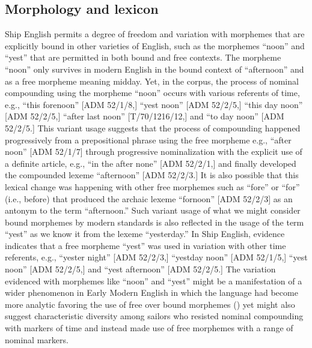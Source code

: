 \subsection{\textbf{Morphology} \textbf{and} \textbf{lexicon}}%

  Ship English permits a degree of freedom and variation with morphemes that are explicitly bound in other varieties of English, such as the morphemes “noon” and “yest” that are permitted in both bound and free contexts. The morpheme “noon” only survives in modern English in the bound context of “afternoon” and as a free morpheme meaning midday. Yet, in the corpus, the process of nominal compounding using the morpheme “noon” occurs with various referents of time, e.g., “this forenoon” [ADM 52/1/8,] “yest noon” [ADM 52/2/5,] “this day noon” [ADM 52/2/5,] “after last noon” [T/70/1216/12,] and “to day noon” [ADM 52/2/5.] This variant usage suggests that the process of compounding happened progressively from a prepositional phrase using the free morpheme e.g., “after noon” [ADM 52/1/7] through progressive nominalization with the explicit use of a definite article, e.g., “in the after none” [ADM 52/2/1,] and finally developed the compounded lexeme “afternoon” [ADM 52/2/3.] It is also possible that this lexical change was happening with other free morphemes such as “fore” or “for” (i.e., before) that produced the archaic lexeme “fornoon” [ADM 52/2/3] as an antonym to the term “afternoon.” Such variant usage of what we might consider bound morphemes by modern standards is also reflected in the usage of the term “yest” as we know it from the lexeme “yesterday.”  In Ship English, evidence indicates that a free morpheme “yest” was used in variation with other time referents, e.g., “yester night” [ADM 52/2/3,] “yestday noon” [ADM 52/1/5,] “yest noon” [ADM 52/2/5,] and “yest afternoon” [ADM 52/2/5.] The variation evidenced with morphemes like “noon” and “yest” might be a manifestation of a wider phenomenon in Early Modern English in which the language had become more analytic favoring the use of free over bound morphemes (\citealt{MillwardHayes2012}) yet might also suggest characteristic diversity among sailors who resisted nominal compounding with markers of time and instead made use of free morphemes with a range of nominal markers.  

